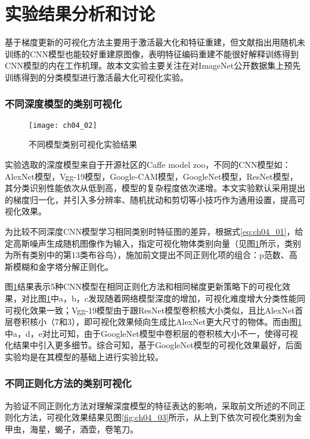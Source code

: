 \section{实验结果分析和讨论}
 
基于梯度更新的可视化方法主要用于激活最大化和特征重建，但文献指出用随机未训练的CNN模型也能较好重建原图像，表明特征编码重建不能很好解释训练得到CNN模型的内在工作机理。故本文实验主要关注在对ImageNet公开数据集上预先训练得到的分类模型进行激活最大化可视化实验。

\subsubsection{不同深度模型的类别可视化} 
\begin{figure}[!htbp]
\centering
\texttt{[image: ch04\_02]}
\caption{不同模型类别可视化实验结果}
\label{fig:ch04_02}
\end{figure}

实验选取的深度模型来自于开源社区的Caffe model zoo，不同的CNN模型如：AlexNet模型\citep{Krizhevsky2012}，Vgg-19模型\citep{Simonyan2014a}，Google-CAM模型\citep{Zhou2015}，GoogleNet模型\citep{Szegedy2015}，ResNet模型\citep{he15}，其分类识别性能依次从低到高，模型的复杂程度依次递增。本文实验默认采用提出的梯度归一化，并引入多分辨率、随机扰动和剪切等小技巧作为通用设置，提高可视化效果。


为比较不同深度CNN模型学习相同类别时特征图的差异，根据式\ref{eq:ch04_01}，给定高斯噪声生成随机图像作为输入，指定可视化物体类别向量（见图\ref{fig:ch04_02}所示，类别为所有类别中的第13类布谷鸟），施加前文提出不同正则化项的组合：p范数、高斯模糊和金字塔分解正则化。


图\ref{fig:ch04_02}结果表示5种CNN模型在相同正则化方法和相同梯度更新策略下的可视化效果，对比图\ref{fig:ch04_02}中a，b，c发现随着网络模型深度的增加，可视化难度增大分类性能同可视化效果一致；Vgg-19模型由于跟ResNet模型卷积核大小类似，且比AlexNet首层卷积核小（7和3），即可视化效果倾向生成比AlexNet更大尺寸的物体。而由图\ref{fig:ch04_02}中a，d，e对比可知，由于GoogleNet模型中卷积层的卷积核大小不一，使得可视化结果中引入更多细节。综合可知，基于GoogleNet模型的可视化效果最好，后面实验均是在其模型的基础上进行实验比较。

\subsubsection{ 不同正则化方法的类别可视化}
为验证不同正则化方法对理解深度模型的特征表达的影响，采取前文所述的不同正则化方法，可视化效果结果见图\ref{fig:ch04_03}所示，从上到下依次可视化类别为金甲虫，海星，蝎子，酒壶，卷笔刀。
 
